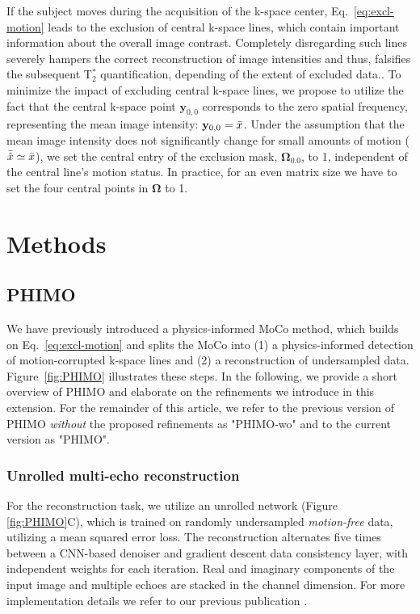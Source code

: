 \documentclass[AMA,STIX2COL]{MRM}
\newcommand{\tstar}[1]{{T$_2^*$}}
\begin{document}
If the subject moves during the acquisition of the k-space center, Eq.~\ref{eq:excl-motion} leads to the exclusion of central k-space lines, which contain important information about the overall image contrast. Completely disregarding such lines severely hampers the correct reconstruction of image intensities and thus, falsifies the subsequent \tstar{} quantification, depending of the extent of excluded data.. 
To minimize the impact of excluding central k-space lines, we propose to utilize the fact that 
the central k-space point $\mathbf{y}_{0,0}$ corresponds to the zero spatial frequency, representing the mean image intensity: $\mathbf{y}_{0,0} = \Bar{x}$.
Under the assumption that the mean image intensity does not significantly change for small amounts of motion ($\Bar{\hat{x}} \simeq \Bar{x}$), we set the central entry of the exclusion mask, $\mathbf{\Omega_{0.0}}$, to 1, independent of the central line's motion status. In practice, for an even matrix size we have to set the four central points in $\mathbf{\Omega}$ to 1.



\section{Methods}\label{sec:methods}
\subsection{PHIMO} \label{sec:methods:phimo}
We have previously introduced a physics-informed MoCo method, which builds on Eq.~\ref{eq:excl-motion} and splits the MoCo into (1) a physics-informed detection of motion-corrupted k-space lines and (2) a reconstruction of undersampled data.\cite{Eichhorn_2024, Eichhorn_2024_ISMRM} Figure~\ref{fig:PHIMO} illustrates these steps. In the following, we provide a short overview of PHIMO and elaborate on the refinements we introduce in this extension. For the remainder of this article, we refer to the previous version of PHIMO \textit{without} the proposed refinements as "PHIMO-wo" and to the current version as "PHIMO".


\subsubsection{Unrolled multi-echo reconstruction} \label{sec:methods:phimo:recon}
For the reconstruction task, we utilize an unrolled network (Figure \ref{fig:PHIMO}C), which is trained on randomly undersampled \textit{motion-free} data, utilizing a mean squared error loss. The reconstruction alternates five times between a CNN-based denoiser and gradient descent data consistency layer, with independent weights for each iteration. Real and imaginary components of the input image and multiple echoes are stacked in the channel dimension. For more implementation details we refer to our previous publication \cite{Eichhorn_2024}. 
\end{document}
